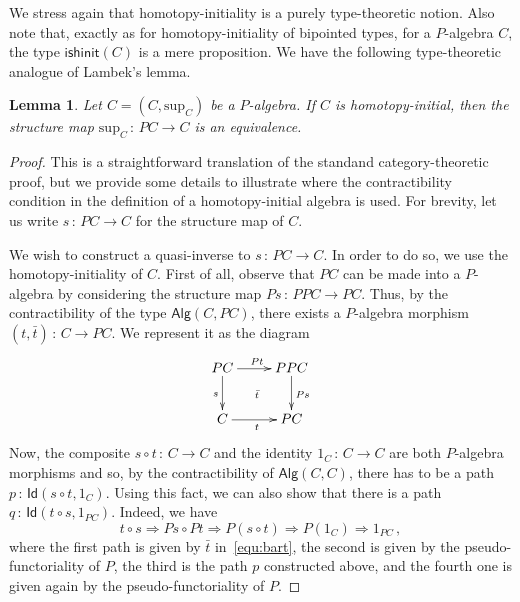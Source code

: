 \documentclass[10pt,a4paper,oneside,reqno]{amsart}
\newcommand{\xycenter}[1]{\vcenter{\hbox{\xymatrix{#1}}}}
\numberwithin{equation}{section}
\theoremstyle{mythm}
\newtheorem{lemma}[theorem]{Lemma}
\theoremstyle{mydef}
\theoremstyle{myrmk}
\newcommand{\co}{\,{:}\,}
\newcommand{\isalghinit}{\mathsf{ishinit}}
\newcommand{\Id}{\mathsf{Id}}
\newcommand{\Palg}{\mathsf{Alg}}
\renewcommand{\sup}{\mathrm{sup}}
\begin{document}
We stress again that homotopy-initiality is a purely type-theoretic notion. Also note that, exactly as for 
homotopy-initiality of bipointed types, for a $P$-algebra $C$, the type
$\isalghinit(C)$ is a mere proposition. 
We have the following type-theoretic analogue of Lambek's lemma.


\begin{lemma}\label{lem:IntLambek} Let $C = (C, \sup_C)$ be a $P$-algebra. 
If $C$ is homotopy-initial, then the structure map $\sup_C \co PC \to C$ is an equivalence.
\end{lemma}


\begin{proof} This is a straightforward translation of the standand category-theoretic proof, but we provide
some details to illustrate where the contractibility condition in the definition of a homotopy-initial algebra is
used. For brevity, let us write $s \co PC \to C$ for the structure map of $C$. 

 We wish to construct a quasi-inverse to $s \co PC \to C$. In order to do so, we use the homotopy-initiality
of $C$. First of all, observe that $PC$ can be made into a $P$-algebra by considering the structure map 
$Ps \co PPC \to PC$. Thus, by the contractibility of the type $\Palg(C, PC)$, there exists a $P$-algebra
morphism $(t, \bar{t}) \co C \to PC$. We represent it as the diagram
\begin{equation}
\label{equ:bart}
\xycenter{
PC \ar[d]_{s} \ar[r]^{Pt} \ar@{}[dr]|{\bar{t}}& PPC \ar[d]^{Ps} \\
C \ar[r]_{t} & PC}
\end{equation}
Now, the composite $s \circ t \co C \to C$ and the identity $1_C \co C \to C$ are both $P$-algebra
morphisms and so, by the contractibility of $\Palg(C,C)$, there has to be a path $p \co \Id(s\circ t ,1_C)$. 
Using this fact, we can also show that there is a path $q \co \Id(t \circ s, 1_{PC})$. Indeed, we have
\[
t \circ s  \Rightarrow Ps \circ Pt 
 \Rightarrow P(s \circ t) 
 \Rightarrow P(1_C) 
  \Rightarrow 1_{PC} \, ,
\]
where the first path is given by $\bar{t}$ in~\eqref{equ:bart}, the second is given by the pseudo-functoriality of $P$,
the third is the path $p$ constructed above, and the fourth one is given again by the pseudo-functoriality of $P$. 
\end{proof}
\end{document}
